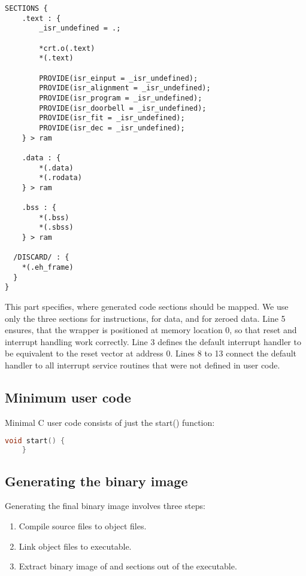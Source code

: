 \begin{lstlisting}
SECTIONS {
	.text : {
        _isr_undefined = .;

        *crt.o(.text)
        *(.text)

        PROVIDE(isr_einput = _isr_undefined);
        PROVIDE(isr_alignment = _isr_undefined);
        PROVIDE(isr_program = _isr_undefined);
        PROVIDE(isr_doorbell = _isr_undefined);
        PROVIDE(isr_fit = _isr_undefined);
        PROVIDE(isr_dec = _isr_undefined);
	} > ram

	.data : {
		*(.data)
		*(.rodata)
	} > ram

	.bss : {
		*(.bss)
		*(.sbss)
	} > ram

  /DISCARD/ : {
    *(.eh_frame)
  }
}
\end{lstlisting}
This part specifies, where generated code sections should be mapped.
We use only the three sections  for instructions,  for data, and  for zeroed data.
Line 5 ensures, that the wrapper is positioned at memory location 0, so that reset and interrupt handling work correctly.
Line 3 defines the default interrupt handler  to be equivalent to the reset vector at address 0.
Lines 8 to 13 connect the default handler to all interrupt service routines that were not defined in user code.


\subsection{Minimum user code}

Minimal C user code consists of just the start() function:
\begin{lstlisting}[language=c]
    void start() {
    }
\end{lstlisting}
\subsection{Generating the binary image}

Generating the final binary image involves three steps:
\begin{enumerate}
    \item Compile source files to object files.
    \item Link object files to executable.
    \item Extract binary image of  and  sections out of the executable.
\end{enumerate}

